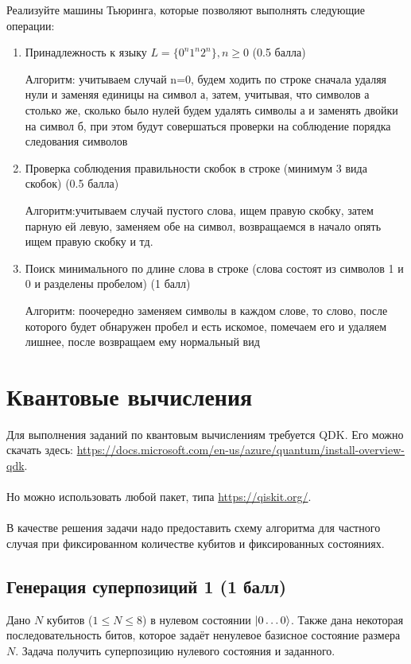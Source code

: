 \documentclass{article}
\begin{document}
Реализуйте машины Тьюринга, которые позволяют выполнять следующие операции:
\begin{enumerate}
    \item Принадлежность к языку $L = \{ 0^n1^n2^n \}, n \ge 0$ (0.5 балла)
    
    Алгоритм: учитываем случай n=0, будем ходить по строке сначала удаляя нули и заменяя единицы на символ а, затем, учитывая, что символов а столько же, сколько было нулей будем удалять символы а и заменять двойки на символ б, при этом будут совершаться проверки на соблюдение порядка следования символов
    
    \item Проверка соблюдения правильности скобок в строке (минимум 3 вида скобок) (0.5 балла)
    
    Алгоритм:учитываем случай пустого слова, ищем правую скобку, затем парную ей левую, заменяем обе на символ, возвращаемся в начало опять ищем правую скобку и тд.
    
    \item Поиск минимального по длине слова в строке (слова состоят из символов 1 и 0 и разделены пробелом) (1 балл)
    
    Алгоритм: поочередно заменяем символы в каждом слове, то слово, после которого будет обнаружен пробел и есть искомое, помечаем его и удаляем лишнее, после возвращаем ему нормальный вид
\end{enumerate}


\section{Квантовые вычисления}

Для выполнения заданий по квантовым вычислениям требуется QDK. Его можно скачать здесь: \url{https://docs.microsoft.com/en-us/azure/quantum/install-overview-qdk}. 
\\\\
Но можно использовать любой пакет, типа \url{https://qiskit.org/}. 
\\\\
В качестве решения задачи надо предоставить схему алгоритма для частного случая при фиксированном количестве кубитов и фиксированных состояниях. 


\subsection{Генерация суперпозиций 1 (1 балл)}

Дано $N$ кубитов ($1 \le N \le 8$) в нулевом состоянии $\Ket{0\dots0}$. Также дана некоторая последовательность битов, которое задаёт ненулевое базисное состояние размера $N$. Задача получить суперпозицию нулевого состояния и заданного.
\end{document}
